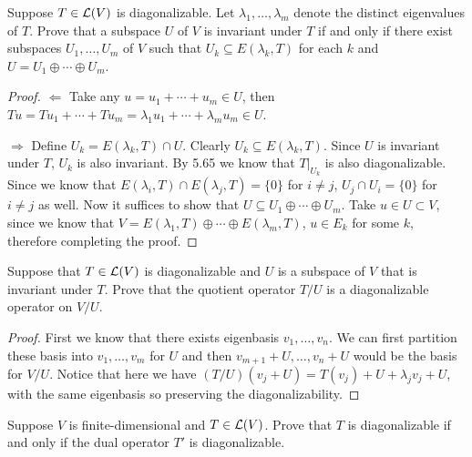 \documentclass{extarticle}
\begin{document}
\begin{problem}{16}
    Suppose \(T \in \mathcal{L}(V)\) is diagonalizable. Let \(\lambda_1, \ldots, \lambda_m\) denote the distinct 
    eigenvalues of \(T\). Prove that a subspace \(U\) of \(V\) is invariant under \(T\) if and only if 
    there exist subspaces \(U_1, \ldots, U_m\) of \(V\) such that \(U_k \subseteq E(\lambda_k, T)\) for 
    each \(k\) and \(U = U_1 \oplus \cdots \oplus U_m\). 
\end{problem}

\begin{proof}
\(\Leftarrow\) Take any \(u = u_1 + \cdots + u_m \in U\), then \(Tu = Tu_1 + \cdots + Tu_m 
= \lambda_1 u_1 + \cdots + \lambda_m u_m \in U\). 

\(\Rightarrow\) Define \(U_k = E(\lambda_k, T) \cap U\). Clearly \(U_k \subseteq E(\lambda_k, T)\). 
Since \(U\) is invariant under \(T\), \({U_k}\) is also invariant. By 5.65 we know that 
\(T |_{U_k}\) is also diagonalizable. Since we know that \(E(\lambda_i, T) \cap E(\lambda_j, T) = \{0\}\) for \(i \neq j\), 
\(U_j \cap U_i = \{0\}\) for \(i \neq j\) as well. Now it suffices to show that 
\(U \subseteq U_1 \oplus \cdots \oplus U_m\). Take \(u \in U \subset V\), since we know that 
\(V = E(\lambda_1, T) \oplus \cdots \oplus E(\lambda_m, T)\), \(u \in E_k\) for some \(k\), therefore 
completing the proof. 
\end{proof}

\begin{problem}{18}
    Suppose that \(T \in \mathcal{L}(V)\) is diagonalizable and \(U\) is a subspace of \(V\) that is invariant under 
    \(T\). Prove that the quotient operator \(T/U\) is a diagonalizable operator on \(V/U\). 
\end{problem}

\begin{proof}
First we know that there exists eigenbasis \(v_1, \ldots, v_n\). We can first partition these basis into 
\(v_1, \ldots, v_m\) for \(U\) and then \(v_{m+1} + U, \ldots, v_n + U\) would be the basis for 
\(V/U\). Notice that here we have \((T/U)(v_j + U) = T(v_j) + U + \lambda_j v_j + U\), with the same eigenbasis 
so preserving the diagonalizability.
\end{proof}

\begin{problem}{20}
    Suppose \(V\) is finite-dimensional and \(T \in \mathcal{L}(V)\). Prove that \(T\) is diagonalizable if 
    and only if the dual operator \(T'\) is diagonalizable. 
\end{problem}
\end{document}
